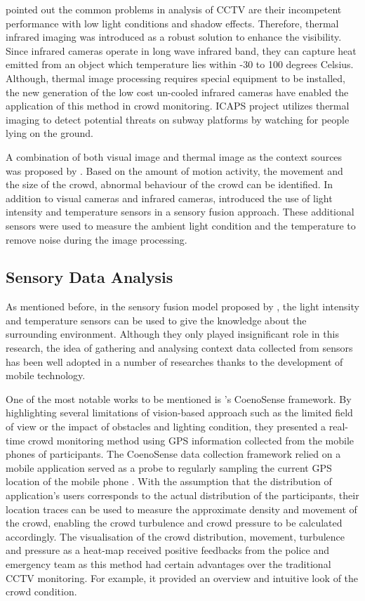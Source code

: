 \citet{Andersson2009} pointed out the common problems in analysis of CCTV are their incompetent performance with low light conditions and shadow effects. Therefore, thermal infrared imaging was introduced as a robust solution to enhance the visibility. Since infrared cameras operate in long wave infrared band, they can capture heat emitted from an object which temperature lies within -30 to 100 degrees Celsius. Although, thermal image processing requires special equipment to be installed, the new generation of the low cost un-cooled infrared cameras have enabled the application of this method in crowd monitoring. ICAPS project \citep{Pham2007} utilizes thermal imaging to detect potential threats on subway platforms by watching for people lying on the ground.

A combination of both visual image and thermal image as the context sources was proposed by \citet{Andersson2009}. Based on the amount of motion activity, the movement and the size of the crowd, abnormal behaviour of the crowd can be identified. In addition to visual cameras and infrared cameras, \citet{Yaseen2013} introduced the use of light intensity and temperature sensors in a sensory fusion approach. These additional sensors were used to measure the ambient light condition and the temperature to remove noise during the image processing.

\subsection{Sensory Data Analysis}
As mentioned before, in the sensory fusion model proposed by \citet{Yaseen2013}, the light intensity and temperature sensors can be used to give the knowledge about the surrounding environment. Although they only played insignificant role in this research, the idea of gathering and analysing context data collected from sensors has been well adopted in a number of researches thanks to the development of mobile technology.

One of the most notable works to be mentioned is \citet{Wirz2012}’s CoenoSense framework. By highlighting several limitations of vision-based approach such as the limited field of view or the impact of obstacles and lighting condition, they presented a real-time crowd monitoring method using GPS information collected from the mobile phones of participants. The CoenoSense data collection framework relied on a mobile application served as a probe to regularly sampling the current GPS location of the mobile phone \citep{Wirz2013}. With the assumption that the distribution of application's users corresponds to the actual distribution of the participants, their location traces can be used to measure the approximate density and movement of the crowd, enabling the crowd turbulence and crowd pressure to be calculated accordingly. The visualisation of the crowd distribution, movement, turbulence and pressure as a heat-map received positive feedbacks from the police and emergency team as this method had certain advantages over the traditional CCTV monitoring. For example, it provided an overview and intuitive look of the crowd condition.

